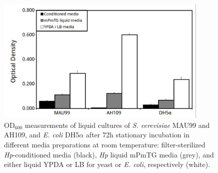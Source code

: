 
\begin{figure}[hb]
  \centering
  \includegraphics[width=4in]{./Chapter_Inhibition/img/yeastEcoli_liqGrowth.png}
  \caption[\textit{S. cerevisiae} and \textit{E. coli} liquid cultures are inhibited by \textit{Hp} conditioned media.]{OD$_{600}$ measurements of liquid cultures of \textit{S. cerevisiae} MAU99 and AH109, and \textit{E. coli} DH5$\alpha$ after 72h stationary incubation in different media preparations at room temperature: filter-sterilized \textit{Hp}-conditioned media (black), \textit{Hp} liquid mPmTG media (grey), and either liquid YPDA or LB for yeast or \textit{E. coli}, respectively (white).}
  \label{fig:ChInhib_HpYeastEcoli}
\end{figure}


